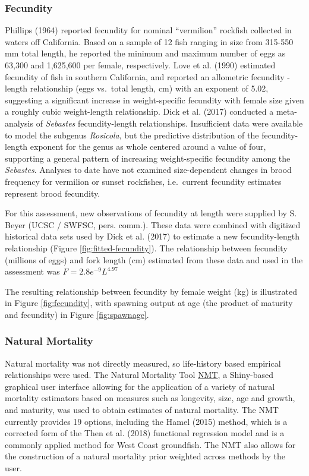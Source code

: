 \documentclass[
  english,
  a4paper,
]{article}
\begin{document}
\hypertarget{fecundity}{%
\subsubsection{Fecundity}\label{fecundity}}

Phillips (1964) reported fecundity for nominal ``vermilion'' rockfish collected in waters off California. Based on a sample of 12 fish ranging in size from 315-550 mm total length, he reported the minimum and maximum number of eggs as 63,300 and 1,625,600 per female, respectively. Love et al. (1990) estimated fecundity of fish in southern California, and reported an allometric fecundity - length relationship (eggs vs.~total length, cm) with an exponent of 5.02, suggesting a significant increase in weight-specific fecundity with female size given a roughly cubic weight-length relationship. Dick et al. (2017) conducted a meta-analysis of \emph{Sebastes} fecundity-length relationships. Insufficient data were available to model the subgenus \emph{Rosicola}, but the predictive distribution of the fecundity-length exponent for the genus as whole centered around a value of four, supporting a general pattern of increasing weight-specific fecundity among the \emph{Sebastes}. Analyses to date have not examined size-dependent changes in brood frequency for vermilion or sunset rockfishes, i.e.~current fecundity estimates represent brood fecundity.

For this assessment, new observations of fecundity at length were supplied by S. Beyer (UCSC / SWFSC, pers. comm.). These data were combined with digitized historical data sets used by Dick et al. (2017) to estimate a new fecundity-length relationship (Figure \ref{fig:fitted-fecundity}). The relationship between fecundity (millions of eggs) and fork length (cm) estimated from these data and used in the assessment was
\(F = 2.8e^{-9}L^{4.97}\)

The resulting relationship between fecundity by female weight (kg) is illustrated in Figure \ref{fig:fecundity}, with spawning output at age (the product of maturity and fecundity) in Figure \ref{fig:spawnage}.

\hypertarget{natural-mortality}{%
\subsubsection{Natural Mortality}\label{natural-mortality}}

Natural mortality was not directly measured, so life-history based empirical
relationships were used. The Natural Mortality Tool
\href{https://github.com/shcaba/Natural-Mortality-Tool}{NMT}, a Shiny-based
graphical user interface allowing for the application of a variety of natural
mortality estimators based on measures such as longevity, size, age and growth,
and maturity, was used to obtain estimates of natural mortality. The NMT currently
provides 19 options, including the Hamel (2015) method, which is a corrected
form of the Then et al. (2018) functional regression model and is a commonly
applied method for West Coast groundfish. The NMT also allows for the construction
of a natural mortality prior weighted across methods by the user.
\end{document}
